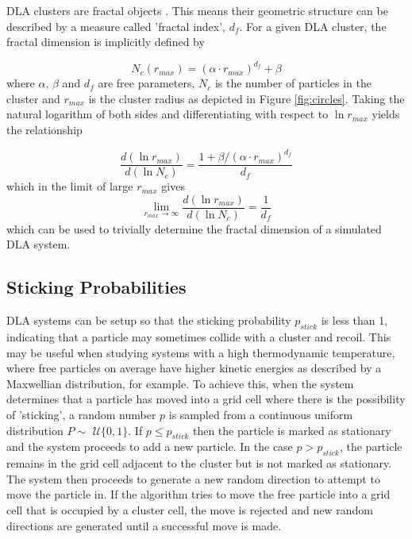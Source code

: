 \documentclass[11pt]{iopart}
\begin{document}
DLA clusters are fractal objects \cite{dla}. This means their geometric structure can be described by a measure called 'fractal index', $d_f$. For a given DLA cluster, the fractal dimension is implicitly defined by \cite{handout}

\begin{equation}
N_c(r_{max}) = (\alpha \cdot r_{max})^{d_f} + \beta
\end{equation} 
where $\alpha$, $\beta$ and $d_f$ are free parameters, $N_c$ is the number of particles in the cluster and $r_{max}$ is the cluster radius as depicted in Figure \ref{fig:circles}.
Taking the natural logarithm of both sides and differentiating with respect to $\ln r_{max}$ yields the relationship

\begin{equation}
\frac{d(\ln r_{max})}{d(\ln N_c)} = \frac{1 + \beta/(\alpha \cdot r_{max})^{d_f}}{d_f}
\end{equation} 
which in the limit of large $r_{max}$ gives
\begin{equation}
\label{dflogequation}
\lim_{r_{max}\to\infty} \frac{d(\ln r_{max})}{d(\ln N_c)}  = \frac{1}{d_f}
\end{equation}
which can be used to trivially determine the fractal dimension of a simulated DLA system.

\subsection{Sticking Probabilities}

DLA systems can be setup so that the sticking probability $p_{stick}$ is less than 1, indicating that a particle may sometimes collide with a cluster and recoil. This may be useful when studying systems with a high thermodynamic temperature, where free particles on average have higher kinetic energies as described by a Maxwellian distribution, for example. To achieve this, when the system determines that a particle has moved into a grid cell where there is the possibility of 'sticking', a random number $p$ is sampled from a continuous uniform distribution $P \sim$ $\mathcal{U}\{0, 1\}$. If $p \leq p_{stick}$ then the particle is marked as stationary and the system proceeds to add a new particle. In the case $p > p_{stick}$, the particle remains in the grid cell adjacent to the cluster but is not marked as stationary. The system then proceeds to generate a new random direction to attempt to move the particle in. If the algorithm tries to move the free particle into a grid cell that is occupied by a cluster cell, the move is rejected and new random directions are generated until a successful move is made.
\end{document}
